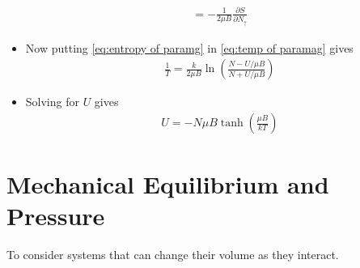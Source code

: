 \documentclass{book}
\begin{document}
\begin{itemize}
\begin{align}
		      = - \frac{1}{2 \mu B} \frac{\partial S}{\partial N_\uparrow}
	      \end{align}
	\item Now putting \eqref{eq:entropy of paramg} in \eqref{eq:temp of paramag} gives
	      \begin{align}
		      \frac{1}{T} = \frac{k}{2 \mu B} \ln{\left( \frac{N - U/\mu B}{N + U/\mu B} \right) }
	      \end{align}
	\item Solving for $ U $ gives
	      \begin{align}
		      U =-  N \mu B \tanh{\left( \frac{\mu B}{kT} \right) }
	      \end{align}
\end{itemize}


\section{Mechanical Equilibrium and Pressure}%
\label{sec:mech equili and pressure}

To consider systems that can change their volume as they interact.
\end{document}
